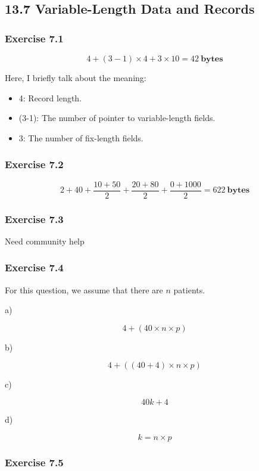 \documentclass[../../main.tex]{subfiles}
\begin{document}
\subsection{13.7 Variable-Length Data and Records}

\subsubsection*{Exercise 7.1}

$$
4 + (3 - 1) \times 4 + 3 \times 10 = 42 \ \mathbf{bytes}
$$

Here, I briefly talk about the meaning:

\begin{itemize}
  \item 4: Record length.
  \item (3-1): The number of pointer to variable-length fields.
  \item 3: The number of fix-length fields.
\end{itemize}

\subsubsection*{Exercise 7.2}

$$
2 + 40 + \frac{10 + 50}{2} + \frac{20 + 80}{2} + \frac{0 + 1000}{2} = 622 \ \mathbf{bytes}
$$

\subsubsection*{Exercise 7.3}

Need community help

\subsubsection*{Exercise 7.4}

For this question, we assume that there are $n$ patients.

a)

$$
4 + (40 \times n \times p)
$$

b)

$$
4 + ((40 + 4) \times n \times p)
$$

c)

$$
40k + 4
$$

d)

$$
k = n \times p
$$

\subsubsection*{Exercise 7.5}
\end{document}
